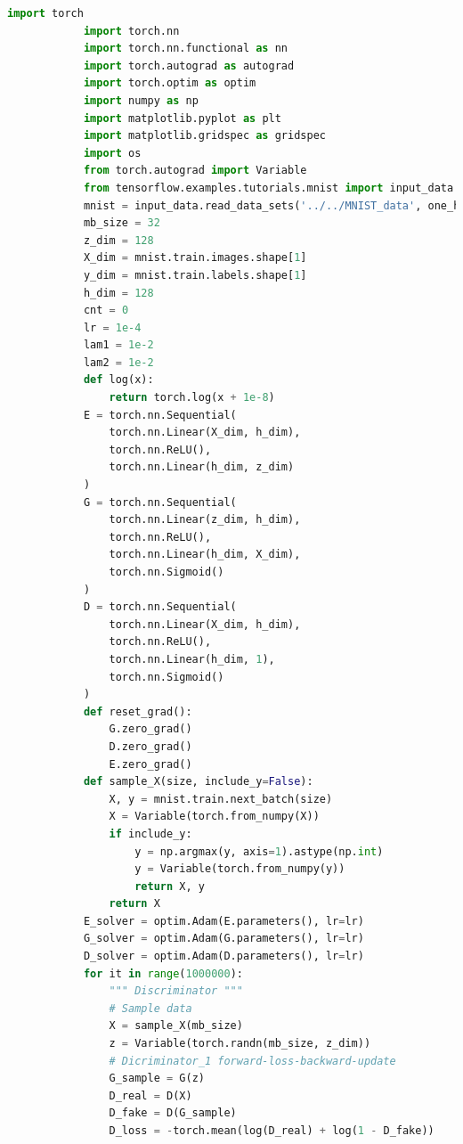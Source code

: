             \begin{lstlisting}[language = Python]
            import torch
            import torch.nn
            import torch.nn.functional as nn
            import torch.autograd as autograd
            import torch.optim as optim
            import numpy as np
            import matplotlib.pyplot as plt
            import matplotlib.gridspec as gridspec
            import os
            from torch.autograd import Variable
            from tensorflow.examples.tutorials.mnist import input_data
            mnist = input_data.read_data_sets('../../MNIST_data', one_hot=True)
            mb_size = 32
            z_dim = 128
            X_dim = mnist.train.images.shape[1]
            y_dim = mnist.train.labels.shape[1]
            h_dim = 128
            cnt = 0
            lr = 1e-4
            lam1 = 1e-2
            lam2 = 1e-2
            def log(x):
                return torch.log(x + 1e-8)
            E = torch.nn.Sequential(
                torch.nn.Linear(X_dim, h_dim),
                torch.nn.ReLU(),
                torch.nn.Linear(h_dim, z_dim)
            )
            G = torch.nn.Sequential(
                torch.nn.Linear(z_dim, h_dim),
                torch.nn.ReLU(),
                torch.nn.Linear(h_dim, X_dim),
                torch.nn.Sigmoid()
            )
            D = torch.nn.Sequential(
                torch.nn.Linear(X_dim, h_dim),
                torch.nn.ReLU(),
                torch.nn.Linear(h_dim, 1),
                torch.nn.Sigmoid()
            )
            def reset_grad():
                G.zero_grad()
                D.zero_grad()
                E.zero_grad()
            def sample_X(size, include_y=False):
                X, y = mnist.train.next_batch(size)
                X = Variable(torch.from_numpy(X))
                if include_y:
                    y = np.argmax(y, axis=1).astype(np.int)
                    y = Variable(torch.from_numpy(y))
                    return X, y
                return X
            E_solver = optim.Adam(E.parameters(), lr=lr)
            G_solver = optim.Adam(G.parameters(), lr=lr)
            D_solver = optim.Adam(D.parameters(), lr=lr)
            for it in range(1000000):
                """ Discriminator """
                # Sample data
                X = sample_X(mb_size)
                z = Variable(torch.randn(mb_size, z_dim))
                # Dicriminator_1 forward-loss-backward-update
                G_sample = G(z)
                D_real = D(X)
                D_fake = D(G_sample)
                D_loss = -torch.mean(log(D_real) + log(1 - D_fake))

\end{lstlisting}
